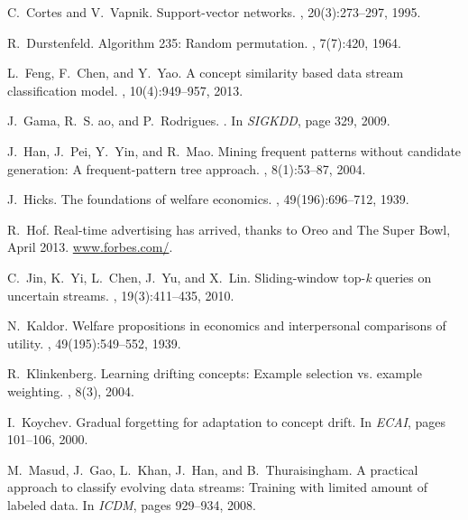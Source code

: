 \documentclass{sig-alternate}
\begin{document}
\begin{thebibliography}{10}
C.~Cortes and V.~Vapnik.
\newblock Support-vector networks.
, 20(3):273--297, 1995.

R.~Durstenfeld.
\newblock Algorithm 235: Random permutation.
, 7(7):420, 1964.

L.~Feng, F.~Chen, and Y.~Yao.
\newblock A concept similarity based data stream classification model.
,
  10(4):949--957, 2013.

J.~Gama, R.~S. {a}o, and P.~Rodrigues.
.
\newblock In {\em SIGKDD}, page 329, 2009.

J.~Han, J.~Pei, Y.~Yin, and R.~Mao.
\newblock Mining frequent patterns without candidate generation: A
  frequent-pattern tree approach.
, 8(1):53--87, 2004.

J.~Hicks.
\newblock The foundations of welfare economics.
, 49(196):696--712, 1939.

R.~Hof.
\newblock Real-time advertising has arrived, thanks to {Oreo} and {The Super
  Bowl}, April 2013.
\newblock \url{www.forbes.com/}.

C.~Jin, K.~Yi, L.~Chen, J.~Yu, and X.~Lin.
\newblock Sliding-window top-{\it k} queries on uncertain streams.
, 19(3):411--435, 2010.

N.~Kaldor.
\newblock Welfare propositions in economics and interpersonal comparisons of
  utility.
, 49(195):549--552, 1939.

R.~Klinkenberg.
\newblock Learning drifting concepts: Example selection vs. example weighting.
, 8(3), 2004.

I.~Koychev.
\newblock Gradual forgetting for adaptation to concept drift.
\newblock In {\em ECAI}, pages 101--106, 2000.

M.~Masud, J.~Gao, L.~Khan, J.~Han, and B.~Thuraisingham.
\newblock A practical approach to classify evolving data streams: Training with
  limited amount of labeled data.
\newblock In {\em ICDM}, pages 929--934, 2008.


\end{thebibliography}
\end{document}
